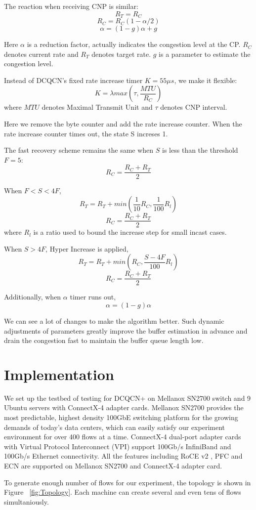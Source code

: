\documentclass[12pt,a4paper]{article}
\begin{document}
The reaction when receiving CNP is similar:
\[R_T=R_C\]
\[R_C=R_C(1-\alpha /2)\]
\[\alpha = (1-g)\alpha + g\]

Here $\alpha$ is a reduction factor, actually indicates the congestion level at the CP.
$R_C$ denotes current rate and $R_T$ denotes target rate.
$g$ is a parameter to estimate the congestion level.

Instead of DCQCN's fixed rate increase timer $K=55\mu s$, we make it flexible:
\[K=\lambda max(\tau, \frac{MTU}{R_C})\]
where $MTU$ denotes Maximal Transmit Unit and $\tau$ denotes CNP interval.

Here we remove the byte counter and add the rate increase counter.
When the rate increase counter times out, the state S increses 1.

The fast recovery scheme remains the same when $S$ is less than the threshold $F = 5$:
\[R_C=\frac{R_C+R_T}{2}\]

When $F<S<4F$,
\[R_T=R_T+ min(\frac{1}{10}R_C,\frac{1}{100}R_l)\]
\[R_C=\frac{R_C+R_T}{2}\]
where $R_l$ is a ratio used to bound the increase step for small incast cases.

When $S>4F$, Hyper Increase is applied,
\[R_T=R_T+min(R_C, \frac{S-4F}{100}R_l)\]
\[R_C=\frac{R_C+R_T}{2}\]

Additionally, when $\alpha$ timer runs out,
\[\alpha=(1-g)\alpha\]

We can see a lot of changes to make the algorithm better.
Such dynamic adjustments of parameters greatly improve the buffer estimation in advance and drain the congestion fast
to maintain the buffer queue length low.

\section{Implementation}

We set up the testbed of testing for DCQCN+ on Mellanox SN2700 switch and 9 Ubuntu servers with ConnectX-4 adapter cards.
Mellanox SN2700 provides the most predictable,
highest density 100GbE switching platform for the growing demands of today's data centers,
which can easily satisfy our experiment environment for over 400 flows at a time.
ConnectX-4 dual-port adapter cards with Virtual Protocol Interconnect (VPI) support 100Gb/s InfiniBand and 100Gb/s Ethernet connectivity.
All the features including RoCE v2 \cite{RoCEv2}, PFC and ECN are supported on Mellanox SN2700 and ConnectX-4 adapter card.

To generate enough number of flows for our experiment, the topology is shown in Figure ~\ref{fig:Topology}.
Each machine can create several and even tens of flows simultaniously.
\end{document}
